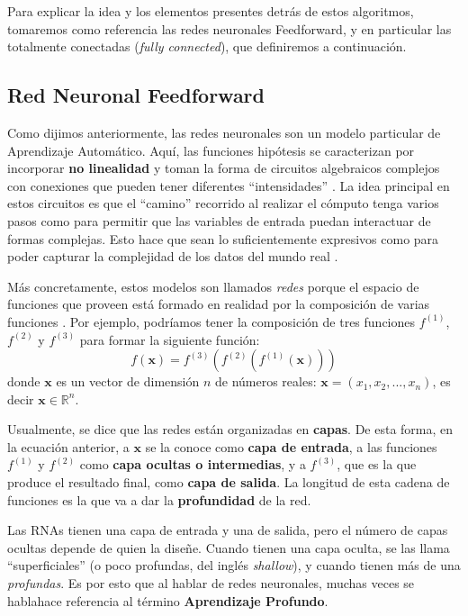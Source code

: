\documentclass[../../main.tex]{subfiles}
\begin{document}
Para explicar la idea y los elementos presentes detrás de estos algoritmos, tomaremos como
referencia las redes neuronales Feedforward, y en particular las totalmente conectadas
(\textit{fully connected}), que definiremos a continuación.


\subsection{Red Neuronal Feedforward}
Como dijimos anteriormente, las redes neuronales son un modelo particular de Aprendizaje
Automático. Aquí, las funciones hipótesis se caracterizan por incorporar \textbf{no
linealidad} y toman la forma de circuitos algebraicos complejos con conexiones que pueden
tener diferentes ``intensidades'' \cite{ai-a-modern-approach}. La idea principal en estos
circuitos es que el ``camino'' recorrido al realizar el cómputo tenga varios pasos como
para permitir que las variables de entrada puedan interactuar de formas complejas. Esto
hace que sean lo suficientemente expresivos como para poder capturar la complejidad de los
datos del mundo real \cite{ai-a-modern-approach}.

Más concretamente, estos modelos son llamados \textit{redes} porque el espacio de
funciones que proveen está formado en realidad por la composición de varias funciones
\cite{deep-learning}. Por ejemplo, podríamos tener la composición de tres funciones
\(f^{(1)}\), \(f^{(2)}\) y \(f^{(3)}\) para formar la siguiente función:
\begin{equation}
    f(\bm{x}) = f^{(3)}(f^{(2)}(f^{(1)}(\bm{x})))
    \label{eq:fun-composition}
\end{equation}
donde \(\bm{x}\) es un vector de dimensión \(n\) de números reales: \(\bm{x}=(x_1,
x_2, ..., x_n)\), es decir \(\bm{x} \in \mathbb{R}^n\).

Usualmente, se dice que las redes están organizadas en \textbf{capas}. De esta forma, en
la ecuación anterior, a \(\bm{x}\) se la conoce como \textbf{capa de entrada}, a las
funciones \(f^{(1)}\) y \(f^{(2)}\) como \textbf{capa ocultas o intermedias}, y a
\(f^{(3)}\), que es la que produce el resultado final, como \textbf{capa de salida}. La
longitud de esta cadena de funciones es la que va a dar la \textbf{profundidad} de la red.

Las RNAs tienen una capa de entrada y una de salida, pero el número de capas ocultas
depende de quien la diseñe. Cuando tienen una capa oculta, se las llama ``superficiales''
(o poco profundas, del inglés \textit{shallow}), y cuando tienen más de una
\textit{profundas}. Es por esto que al hablar de redes neuronales, muchas veces se
hablahace referencia al término \textbf{Aprendizaje Profundo}.
\end{document}
